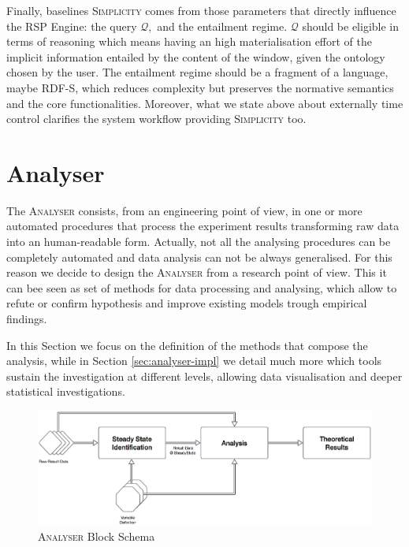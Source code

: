 Finally, baselines \textsc{Simplicity} comes from those parameters that directly influence the RSP Engine: the query $\mathcal{Q},$ and the entailment regime. $\mathcal{Q}$ should be eligible in terms of reasoning which means having an high materialisation effort of the implicit information entailed by the content of the window, given the ontology chosen by the user. The entailment regime should be a fragment of a language, maybe RDF-S, which reduces complexity but preserves the normative semantics and the core functionalities. Moreover, what we state above about externally time control clarifies the system workflow providing \textsc{Simplicity} too.

\section{Analyser}\label{sec:analyser}

The \textsc{Analyser} consists, from an engineering point of view, in one or more automated procedures that process the experiment results transforming raw data into an human-readable form. Actually, not all the analysing procedures can be completely automated and data analysis can not be always generalised. For this reason we decide to design the \textsc{Analyser} from a research point of view. This it can bee seen as set of methods for data processing and analysing, which allow to refute or confirm hypothesis and improve existing models trough empirical findings.

In this Section we focus on the definition of the methods that compose the analysis, while in Section \ref{sec:analyser-impl} we detail much more which tools sustain the investigation at different levels, allowing data visualisation and deeper statistical investigations. \\

\begin{figure}[tbh]
  \centering
	\includegraphics[width=\linewidth]{images/analyser-block-schema}
	\caption{\textsc{Analyser} Block Schema} 
  	\label{fig:analyser-block-schema}
\end{figure}

